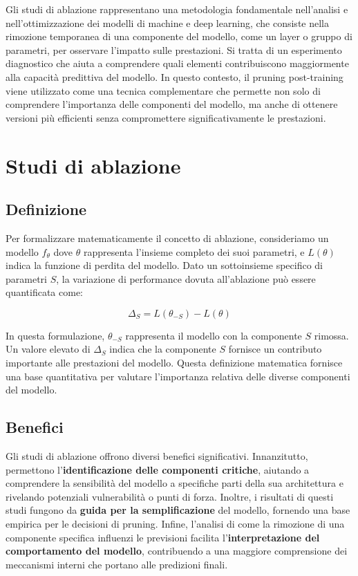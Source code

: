 \documentclass[a4paper,12pt]{report}
\begin{document}
	Gli studi di ablazione rappresentano una metodologia fondamentale nell'analisi e nell'ottimizzazione dei modelli di machine e deep learning, che consiste nella rimozione temporanea di una componente del modello, come un layer o gruppo di parametri, per osservare l'impatto sulle prestazioni. Si tratta di un esperimento diagnostico che aiuta a comprendere quali elementi contribuiscono maggiormente alla capacità predittiva del modello. In questo contesto, il pruning post-training viene utilizzato come una tecnica complementare che permette non solo di comprendere l'importanza delle componenti del modello, ma anche di ottenere versioni più efficienti senza compromettere significativamente le prestazioni.
	
	\section{Studi di ablazione}
	
	\subsection{Definizione}
	Per formalizzare matematicamente il concetto di ablazione, consideriamo un modello $f_\theta$ dove $\theta$ rappresenta l'insieme completo dei suoi parametri, e $L(\theta)$ indica la funzione di perdita del modello. Dato un sottoinsieme specifico di parametri $S$, la variazione di performance dovuta all'ablazione può essere quantificata come:
	
	\[
	\Delta_S = L(\theta_{-S}) - L(\theta)
	\]
	
	In questa formulazione, $\theta_{-S}$ rappresenta il modello con la componente $S$ rimossa. Un valore elevato di $\Delta_S$ indica che la componente $S$ fornisce un contributo importante alle prestazioni del modello. Questa definizione matematica fornisce una base quantitativa per valutare l'importanza relativa delle diverse componenti del modello.
	
	\subsection{Benefici}
	Gli studi di ablazione offrono diversi benefici significativi. Innanzitutto, permettono l'\textbf{identificazione delle componenti critiche}, aiutando a comprendere la sensibilità del modello a specifiche parti della sua architettura e rivelando potenziali vulnerabilità o punti di forza. Inoltre, i risultati di questi studi fungono da \textbf{guida per la semplificazione} del modello, fornendo una base empirica per le decisioni di pruning. Infine, l'analisi di come la rimozione di una componente specifica influenzi le previsioni facilita l'\textbf{interpretazione del comportamento del modello}, contribuendo a una maggiore comprensione dei meccanismi interni che portano alle predizioni finali.
	
\end{document}
